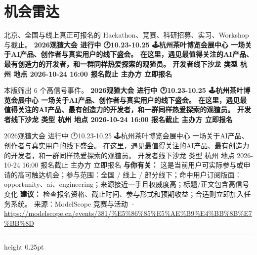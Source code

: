 \documentclass[10.5pt]{ctexart}
\begin{document}
\section*{机会雷达}
{\color{ormuted} 北京、全国与线上真正可报名的 Hackathon、竞赛、科研招募、实习、Workshop 与截止。}
\vspace{2mm}
{\LARGE\bfseries 2026观猹大会 进行中 🕐10.23-10.25 🕹️杭州茶叶博览会展中心 一场关于AI产品、创作者与真实用户的线下盛会。 在这里，遇见最值得关注的AI产品、最有创造力的开发者，和一群同样热爱探索的观猹员。 开发者线下沙龙 类型 杭州 地点 2026-10-24 16:00 报名截止 主办方 立即报名}\par
\vspace{1mm}
{\color{ormuted} 本版筛出 6 个高信号事件。}
\vspace{3mm}
{\Large\bfseries 2026观猹大会 进行中 🕐10.23-10.25 🕹️杭州茶叶博览会展中心 一场关于AI产品、创作者与真实用户的线下盛会。 在这里，遇见最值得关注的AI产品、最有创造力的开发者，和一群同样热爱探索的观猹员。 开发者线下沙龙 类型 杭州 地点 2026-10-24 16:00 报名截止 主办方 立即报名}\par
2026观猹大会 进行中 🕐10.23-10.25 🕹️杭州茶叶博览会展中心 一场关于AI产品、创作者与真实用户的线下盛会。 在这里，遇见最值得关注的AI产品、最有创造力的开发者，和一群同样热爱探索的观猹员。 开发者线下沙龙 类型 杭州 地点 2026-10-24 16:00 报名截止 主办方 立即报名
\textbf{与你有关：} 这是当前用户可实际参与或申请的高可触达机会；参与范围：全国 / 线上 / 部分线下；命中用户订阅版面：opportunity、ai、engineering；来源接近一手且权威度高；标题/正文包含高信号变化
\textbf{建议：} 检查报名资格、截止时间、参与形式和预期收益；合适则立即加入任务系统。
{\footnotesize\color{ormuted} 来源：ModelScope 竞赛与活动 · \url{https://modelscope.cn/events/381/%E5%86%85%E5%AE%B9%E4%BB%8B%E7%BB%8D}}
\vspace{4mm}
\hrule height 0.25pt
\vspace{3mm}
\end{document}
